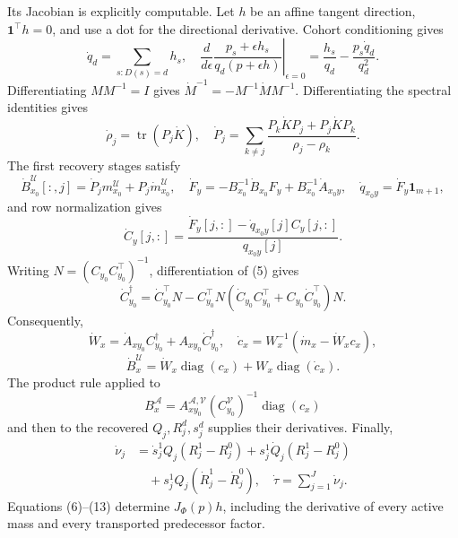 Its Jacobian is explicitly computable.  Let \(h\) be an affine tangent direction, \(\mathbf1^\top h=0\), and use a dot for the directional derivative.  Cohort conditioning gives
\[
 \dot q_d=\sum_{s:D(s)=d}h_s,
 \quad
 \left.\frac{d}{d\epsilon}
 \frac{p_s+\epsilon h_s}{q_d(p+\epsilon h)}\right|_{\epsilon=0}
 =\frac{h_s}{q_d}-\frac{p_s\dot q_d}{q_d^2}.
\tag{6}
\]
Differentiating \(MM^{-1}=I\) gives \(\dot M^{-1}=-M^{-1}\dot M M^{-1}\).  Differentiating the spectral identities gives
\[
 \dot\rho_j=\operatorname{tr}(P_j\dot K),
 \quad
 \dot P_j=\sum_{k\ne j}
 \frac{P_k\dot K P_j+P_j\dot K P_k}{\rho_j-\rho_k}.
\tag{7}
\]
The first recovery stages satisfy
\[
 \dot B_{x_0}^{\mathcal U}[:,j]
 =\dot P_jm_{x_0}^{\mathcal U}+P_j\dot m_{x_0}^{\mathcal U},
 \quad
 \dot F_y=-B_{x_0}^{-1}\dot B_{x_0}F_y+B_{x_0}^{-1}\dot A_{x_0y},
 \quad
 \dot q_{x_0y}=\dot F_y\mathbf1_{m+1},
\tag{8}
\]
and row normalization gives
\[
 \dot C_y[j,:]
 =\frac{\dot F_y[j,:]-\dot q_{x_0y}[j]C_y[j,:]}{q_{x_0y}[j]}.
\tag{9}
\]
Writing \(N=(C_{y_0}C_{y_0}^\top)^{-1}\), differentiation of (5) gives
\[
 \dot C_{y_0}^\dagger
 =\dot C_{y_0}^\top N-C_{y_0}^\top N
 (\dot C_{y_0}C_{y_0}^\top+C_{y_0}\dot C_{y_0}^\top)N.
\tag{10}
\]
Consequently,
\[
 \dot W_x=\dot A_{xy_0}C_{y_0}^\dagger+A_{xy_0}\dot C_{y_0}^\dagger,
 \quad
 \dot c_x=W_x^{-1}(\dot m_x-\dot W_xc_x),
\tag{11}
\]
\[
 \dot B_x^{\mathcal U}
 =\dot W_x\operatorname{diag}(c_x)+W_x\operatorname{diag}(\dot c_x).
\tag{12}
\]
The product rule applied to
\[
 B_x^{\mathcal A}=A_{xy_0}^{\mathcal A,\mathcal V}
 (C_{y_0}^{\mathcal V})^{-1}\operatorname{diag}(c_x)
\]
and then to the recovered \(Q_j,R_j^d,s_j^d\) supplies their derivatives.  Finally,
\[
\begin{aligned}
 \dot\nu_j
 &=\dot s_j^1Q_j(R_j^1-R_j^0)+s_j^1\dot Q_j(R_j^1-R_j^0)\\
 &\quad+s_j^1Q_j(\dot R_j^1-\dot R_j^0),
 \quad
 \dot\tau=\sum_{j=1}^J\dot\nu_j.
\end{aligned}
\tag{13}
\]
Equations (6)--(13) determine \(J_\Phi(p)h\), including the derivative of every active mass and every transported predecessor factor.

